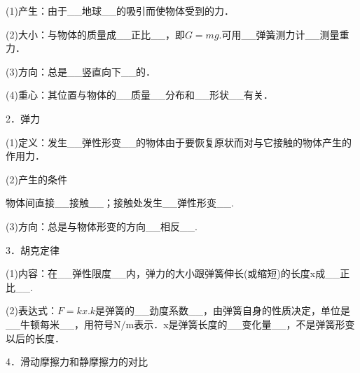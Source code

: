 \documentclass[cn,10.5pt,chinese,mac,chinesefont=founder]{elegantbook}
\begin{document}
(1)产生：由于\_\_地球\_\_的吸引而使物体受到的力．

(2)大小：与物体的质量成\_\_正比\_\_，即$G=m g$.可用\_\_弹簧测力计\_\_测量重力．

(3)方向：总是\_\_竖直向下\_\_的．

(4)重心：其位置与物体的\_\_质量\_\_分布和\_\_形状\_\_有关．

2．弹力

(1)定义：发生\_\_弹性形变\_\_的物体由于要恢复原状而对与它接触的物体产生的作用力．

(2)产生的条件

物体间直接\_\_接触\_\_；接触处发生\_\_弹性形变\_\_.

(3)方向：总是与物体形变的方向\_\_相反\_\_.

3．胡克定律

(1)内容：在\_\_弹性限度\_\_内，弹力的大小跟弹簧伸长(或缩短)的长度x成\_\_正比\_\_.

(2)表达式：$F=kx$.$k$是弹簧的\_\_劲度系数\_\_，由弹簧自身的性质决定，单位是\_\_牛顿每米\_\_，用符号$\mathrm{N} / \mathrm{m}$表示．x是弹簧长度的\_\_变化量\_\_，不是弹簧形变以后的长度．

4．滑动摩擦力和静摩擦力的对比
\end{document}
